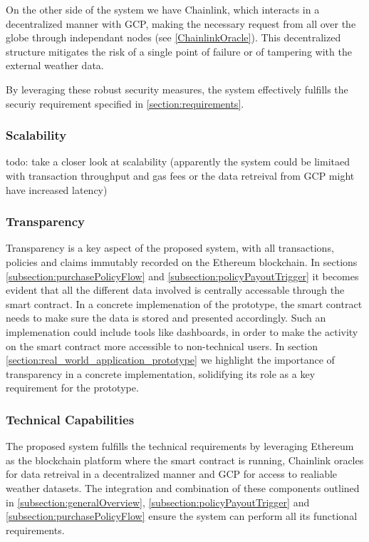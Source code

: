 On the other side of the system we have Chainlink, which interacts in a decentralized manner with GCP, making the necessary request from all over the globe through independant nodes (see \cref{ChainlinkOracle}). This decentralized structure mitigates the risk of a single point of failure or of tampering with the external weather data.

By leveraging these robust security measures, the system effectively fulfills the securiy requirement specified in \cref{section:requirements}.

\subsubsection{Scalability}
todo: take a closer look at scalability (apparently the system could be limitaed with transaction throughput and gas fees or the data retreival from GCP might have increased latency)


\subsubsection{Transparency}
Transparency is a key aspect of the proposed system, with all transactions, policies and claims immutably recorded on the Ethereum blockchain. In sections \cref{subsection:purchasePolicyFlow} and \cref{subsection:policyPayoutTrigger} it becomes evident that all the different data involved is centrally accessable through the smart contract. In a concrete implemenation of the prototype, the smart contract needs to make sure the data is stored and presented accordingly. Such an implemenation could include tools like dashboards, in order to make the activity on the smart contract more accessible to non-technical users. In section \cref{section:real_world_application_prototype} we highlight the importance of transparency in a concrete implementation, solidifying its role as a key requirement for the prototype.

\subsubsection{Technical Capabilities}
The proposed system fulfills the technical requirements by leveraging Ethereum as the blockchain platform where the smart contract is running, Chainlink oracles for data retreival in a decentralized manner and GCP for access to realiable weather datasets. The integration and combination of these components outlined in \cref{subsection:generalOverview}, \cref{subsection:policyPayoutTrigger} and \cref{subsection:purchasePolicyFlow} ensure the system can perform all its functional requirements.

